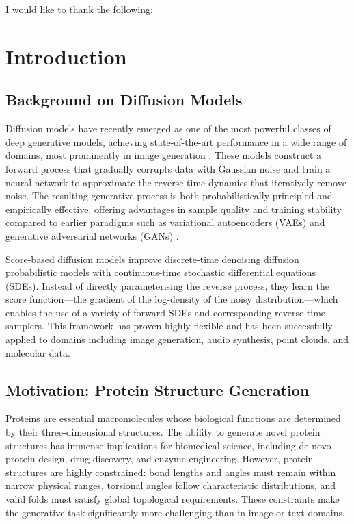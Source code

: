 \documentclass[a4paper,12pt]{article}
\begin{document}
I would like to thank the following:
\clearpage

\tableofcontents
\listoffigures
\listoftables
\clearpage


\section{Introduction}
\subsection{Background on Diffusion Models}
Diffusion models have recently emerged as one of the most powerful classes of deep generative models, achieving state-of-the-art performance in a wide range of domains, most prominently in image generation \cite{hoDenoisingDiffusionProbabilistic2020, dhariwal2021DiffusionModelsBeat}. These models construct a forward process that gradually corrupts data with Gaussian noise and train a neural network to approximate the reverse-time dynamics that iteratively remove noise. The resulting generative process is both probabilistically principled and empirically effective, offering advantages in sample quality and training stability compared to earlier paradigms such as variational autoencoders (VAEs) \cite{kingma2022AutoEncodingVariationalBayes} and generative adversarial networks (GANs) \cite{goodfellow2020GenerativeAdversarialNetworks}.

Score-based diffusion models \cite{song2021ScoreBasedGenerativeModeling,songMaximumLikelihoodTraining2021} improve discrete-time denoising diffusion probabilistic models with continuous-time stochastic differential equations (SDEs). Instead of directly parameterising the reverse process, they learn the score function---the gradient of the log-density of the noisy distribution---which enables the use of a variety of forward SDEs and corresponding reverse-time samplers. This framework has proven highly flexible and has been successfully applied to domains including image generation, audio synthesis, point clouds, and molecular data.

\subsection{Motivation: Protein Structure Generation}
Proteins are essential macromolecules whose biological functions are determined by their three-dimensional structures. The ability to generate novel protein structures has immense implications for biomedical science, including de novo protein design, drug discovery, and enzyme engineering. However, protein structures are highly constrained: bond lengths and angles must remain within narrow physical ranges, torsional angles follow characteristic distributions, and valid folds must satisfy global topological requirements. These constraints make the generative task significantly more challenging than in image or text domains.
\end{document}
